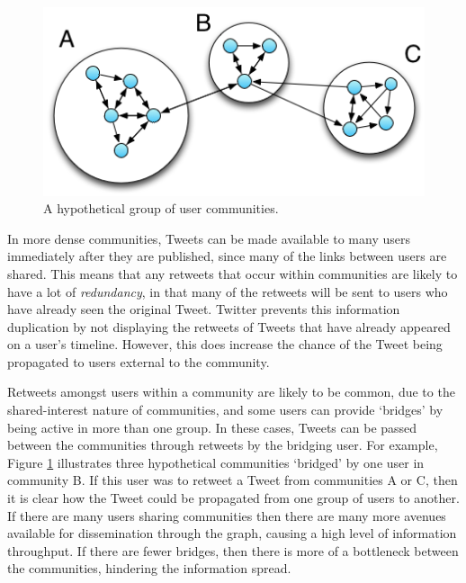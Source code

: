 \begin{figure}[h]
\centering
\includegraphics[scale=0.7]{2.Background/Media/communities.png} 
\caption{A hypothetical group of user communities.}
\label{fig:communities}
\end{figure}

In more dense communities, Tweets can be made available to many users immediately after they are published, since many of the links between users are shared. This means that any retweets that occur within communities are likely to have a lot of \textit{redundancy}, in that many of the retweets will be sent to users who have already seen the original Tweet. Twitter prevents this information duplication by not displaying the retweets of Tweets that have already appeared on a user's timeline. However, this does increase the chance of the Tweet being propagated to users external to the community.

Retweets amongst users within a community are likely to be common, due to the shared-interest nature of communities, and some users can provide `bridges' by being active in more than one group. In these cases, Tweets can be passed between the communities through retweets by the bridging user. For example, Figure \ref{fig:communities} illustrates three hypothetical communities `bridged' by one user in community B. If this user was to retweet a Tweet from communities A or C, then it is clear how the Tweet could be propagated from one group of users to another. If there are many users sharing communities then there are many more avenues available for dissemination through the graph, causing a high level of information throughput. If there are fewer bridges, then there is more of a bottleneck between the communities, hindering the information spread.

